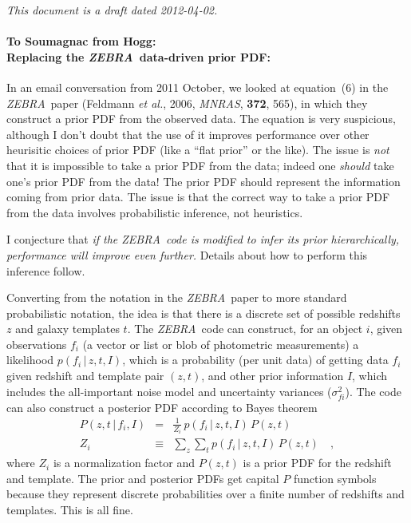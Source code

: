 \documentclass[12pt]{article}
\newcommand{\etal}{\textit{et al.}}
\newcommand{\ZEBRA}{\textsl{ZEBRA}}
\newcommand{\given}{\,|\,}
\begin{document}
\noindent\textsl{This document is a draft dated 2012-04-02.}

\paragraph{To Soumagnac from Hogg:\\ Replacing the \ZEBRA\ data-driven prior PDF:}
In an email conversation from 2011 October, we looked at equation~(6)
in the \ZEBRA\ paper (Feldmann \etal, 2006, \textit{MNRAS},
\textbf{372}, 565), in which they construct a prior PDF from the
observed data.  The equation is very suspicious, although I don't
doubt that the use of it improves performance over other heurisitic
choices of prior PDF (like a ``flat prior'' or the like).  The issue
is \emph{not} that it is impossible to take a prior PDF from the data;
indeed one \emph{should} take one's prior PDF from the data!  The
prior PDF should represent the information coming from prior data.
The issue is that the correct way to take a prior PDF from the data
involves probabilistic inference, not heuristics.

I conjecture that \emph{if the \ZEBRA\ code is modified to infer its
  prior hierarchically, performance will improve even further.}
Details about how to perform this inference follow.

Converting from the notation in the \ZEBRA\ paper to more standard
probabilistic notation, the idea is that there is a discrete set of
possible redshifts $z$ and galaxy templates $t$.  The \ZEBRA\ code can
construct, for an object $i$, given observations $f_i$ (a vector or
list or blob of photometric measurements) a likelihood $p(f_i \given
z, t, I)$, which is a probability (per unit data) of getting data
$f_i$ given redshift and template pair $(z, t)$, and other prior
information $I$, which includes the all-important noise model and
uncertainty variances ($\sigma_{fi}^2$).  The code can also construct
a posterior PDF according to Bayes theorem
\begin{eqnarray}\displaystyle
P(z, t \given f_i, I) &=&
  \frac{1}{Z_i}\,p(f_i \given z, t, I)\,P(z, t)
\\
Z_i &\equiv& \sum_z\sum_t p(f_i \given z, t, I)\,P(z, t)
\quad ,
\end{eqnarray}
where $Z_i$ is a normalization factor and $P(z, t)$ is a
prior PDF for the redshift and template.  The prior and posterior PDFs
get capital $P$ function symbols because they represent discrete
probabilities over a finite number of redshifts and templates.  This
is all fine.
\end{document}
